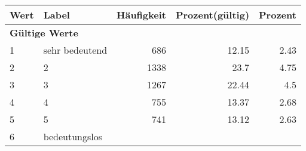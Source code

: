      \begin{longtable}{lXrrr}
     \toprule
     \textbf{Wert} & \textbf{Label} & \textbf{Häufigkeit} & \textbf{Prozent(gültig)} & \textbf{Prozent} \\
     \endhead
     \midrule
     \multicolumn{5}{l}{\textbf{Gültige Werte}}\\

     1 &
     \multicolumn{1}{X}{ sehr bedeutend   } &


       \num{686} &
       \num[round-mode=places,round-precision=2]{12.15} &
         \num[round-mode=places,round-precision=2]{2.43} \\

     2 &
     \multicolumn{1}{X}{ 2   } &


       \num{1338} &
       \num[round-mode=places,round-precision=2]{23.7} &
         \num[round-mode=places,round-precision=2]{4.75} \\

     3 &
     \multicolumn{1}{X}{ 3   } &


       \num{1267} &
       \num[round-mode=places,round-precision=2]{22.44} &
         \num[round-mode=places,round-precision=2]{4.5} \\

     4 &
     \multicolumn{1}{X}{ 4   } &


       \num{755} &
       \num[round-mode=places,round-precision=2]{13.37} &
         \num[round-mode=places,round-precision=2]{2.68} \\

     5 &
     \multicolumn{1}{X}{ 5   } &


       \num{741} &
       \num[round-mode=places,round-precision=2]{13.12} &
         \num[round-mode=places,round-precision=2]{2.63} \\

     6 &
     \multicolumn{1}{X}{ bedeutungslos   } &



\end{longtable}
